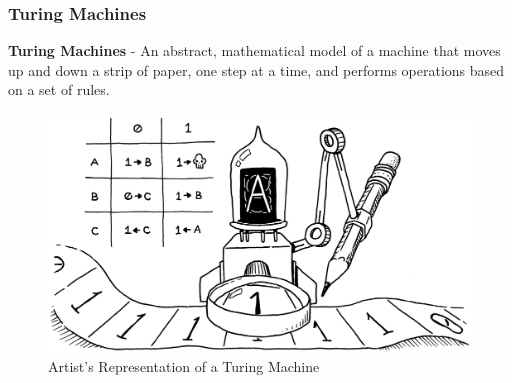 \documentclass{beamer}
\begin{document}
%
%
\begin{frame}
  \frametitle{Turing Machines}
  \begin{minipage}{0.59\textwidth}
      \textbf{Turing Machines} - An abstract, mathematical model of a machine that moves up and down a strip of paper, one step at a time, and performs operations based on a set of rules.
  \end{minipage}
  \begin{minipage}{0.39\textwidth}
    \begin{figure}
      \includegraphics[width=\textwidth]{imgs/turing-machine.png}
      \caption{Artist's Representation of a Turing Machine}
      \label{fig:turingmachine}
    \end{figure}
  \end{minipage}
\end{frame}
\end{document}
